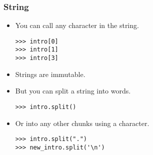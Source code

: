 \documentclass[xcolor=x11names,compress]{beamer}
\renewcommand{\(}{\begin{columns}}
\renewcommand{\)}{\end{columns}}
\newcommand{\<}[1]{\begin{column}{#1}}
\renewcommand{\>}{\end{column}}
\begin{document}
\begin{frame}[fragile]
 \frametitle{String}
 \begin{itemize}
 	\item You can call any character in the string. \pause
\begin{verbatim}
>>> intro[0]
>>> intro[1]
>>> intro[3]
\end{verbatim}
 \pause
 	\item Strings are immutable.  \pause
	\item But you can split a string into words. \pause
\begin{verbatim}
>>> intro.split()
\end{verbatim}
\pause
	 \item Or into any other chunks using a character. \pause
\begin{verbatim}
>>> intro.split(".")
>>> new_intro.split('\n')
\end{verbatim} \pause
 \end{itemize}
\end{frame}
\end{document}
